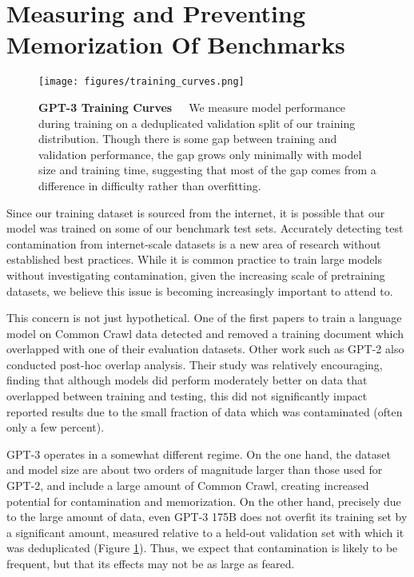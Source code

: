 \documentclass{article}
\begin{document}
 \section{Measuring and Preventing Memorization Of Benchmarks}
\begin{figure}
\centering\texttt{[image: figures/training\_curves.png]}

\caption{\textbf{GPT-3 Training Curves}~~~We measure model performance during training on a deduplicated validation split of our training distribution. Though there is some gap between training and validation performance, the gap grows only minimally with model size and training time, suggesting that most of the gap comes from a difference in difficulty rather than overfitting.}
\label{graph:training_curves}
\end{figure} \label{section:measuring_and_preventing_memorization_of_benchmarks}
Since our training dataset is sourced from the internet, it is possible that our model was trained on some of our benchmark test sets.  Accurately detecting test contamination from internet-scale datasets is a new area of research without established best practices. While it is common practice to train large models without investigating contamination, given the increasing scale of pretraining datasets, we believe this issue is becoming increasingly important to attend to.

This concern is not just hypothetical. One of the first papers to train a language model on Common Crawl data \cite{trinh2018simple} detected and removed a training document which overlapped with one of their evaluation datasets. Other work such as GPT-2 \cite{radford2019language} also conducted post-hoc overlap analysis. Their study was relatively encouraging, finding that although models did perform moderately better on data that overlapped between training and testing, this did not significantly impact reported results due to the small fraction of data which was contaminated (often only a few percent).

GPT-3 operates in a somewhat different regime.  On the one hand, the dataset and model size are about two orders of magnitude larger than those used for GPT-2, and include a large amount of Common Crawl, creating increased potential for contamination and memorization.  On the other hand, precisely due to the large amount of data, even GPT-3 175B does not overfit its training set by a significant amount, measured relative to a held-out validation set with which it was deduplicated (Figure \ref{graph:training_curves}).  Thus, we expect that contamination is likely to be frequent, but that its effects may not be as large as feared.
\end{document}
